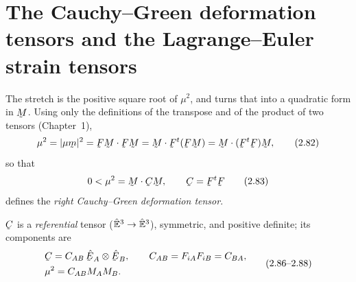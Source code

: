 \section{The Cauchy--Green deformation tensors and the Lagrange--Euler
strain tensors}\label{sec:cauchygreen}

The stretch is the positive square root of $\mu^2$, and  turns that
into a quadratic form in $\bM$. Using only the definitions of the transpose
and of the product of two tensors (Chapter~1),
\begin{equation}
   \mu^{2}=|\mu\bmm|^{2}=\ip{\bF\bM}{\bF\bM}
   =\ip\bM{\bF^{t}(\bF\bM)}=\ip\bM{(\bF^{t}\bF)\bM}, \tag{2.82}\label{eq:2.82}
\end{equation}
so that
\begin{equation}
   0<\mu^{2}=\ip\bM{\bC\bM},\qquad \bC=\bF^{t}\bF \tag{2.83}\label{eq:2.83}
\end{equation}
defines the \emph{right Cauchy--Green deformation tensor}.

\begin{proposition}[Properties of $\bC$]\label{prop:C}
$\bC$ is a \emph{referential} tensor ($\hat{\mathbb{E}}^{3}\to\hat{\mathbb{E}}^{3}$), symmetric, and
positive definite; its components are
\begin{equation}
\begin{aligned}
   &\bC=C_{AB}\,\hbE_A\otimes\hbE_B,\qquad
   C_{AB}=F_{iA}F_{iB}=C_{BA},\\
   &\mu^{2}=C_{AB}M_AM_B.
\end{aligned}
\tag{2.86--2.88}\label{eq:2.86}
\end{equation}
\end{proposition}

